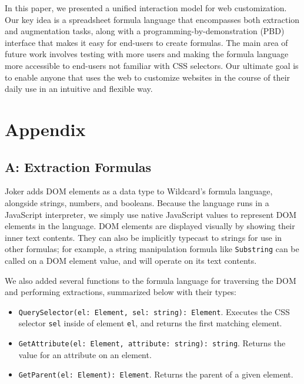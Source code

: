 \documentclass[sigconf,10pt]{acmart}
\providecommand{\tightlist}{%
  \setlength{\itemsep}{0pt}\setlength{\parskip}{0pt}}
\begin{document}
In this paper, we presented a unified interaction model for web
customization. Our key idea is a spreadsheet formula language that
encompasses both extraction and augmentation tasks, along with a
programming-by-demonstration (PBD) interface that makes it easy for
end-users to create formulas. The main area of future work involves
testing with more users and making the formula language more accessible
to end-users not familiar with CSS selectors. Our ultimate goal is to
enable anyone that uses the web to customize websites in the course of
their daily use in an intuitive and flexible way.

\newpage





\clearpage
\hypertarget{appendix}{%
\section*{Appendix}\label{appendix}}

\hypertarget{appendix-a}{%
\subsection*{A: Extraction Formulas}\label{appendix-a}}

Joker adds DOM elements as a data type to Wildcard's formula language, alongside strings,
numbers, and booleans. Because the language runs in a JavaScript
interpreter, we simply use native JavaScript values to represent DOM
elements in the language. DOM elements are displayed visually by showing
their inner text contents. They can also be implicitly typecast to
strings for use in other formulas; for example, a string manipulation
formula like \texttt{Substring} can be called on a DOM element value,
and will operate on its text contents.

We also added several functions to the formula language for traversing
the DOM and performing extractions, summarized below with their types:

\begin{itemize}
\tightlist
\item
  \texttt{QuerySelector(el:\ Element,\ sel:\ string):\ Element}.
  Executes the CSS selector \texttt{sel} inside of element \texttt{el},
  and returns the first matching element.
\item
  \texttt{GetAttribute(el:\ Element,\ attribute:\ string):\ string}.
  Returns the value for an attribute on an element.
\item
  \texttt{GetParent(el:\ Element):\ Element}. Returns the parent of a
  given element.
\end{itemize}
\end{document}

